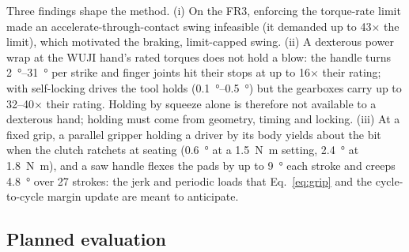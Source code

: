 Three findings shape the method. (i) On the FR3, enforcing the torque-rate limit made an accelerate-through-contact
swing infeasible (it demanded up to 43$\times$ the limit), which motivated the braking, limit-capped swing. (ii) A
dexterous power wrap at the WUJI hand's rated torques does not hold a blow: the handle turns
\SIrange{2}{31}{\degree} per strike and finger joints hit their stops at up to 16$\times$ their rating; with
self-locking drives the tool holds (\SIrange{0.1}{0.5}{\degree}) but the gearboxes carry up to 32--40$\times$ their
rating. Holding by squeeze alone is therefore not available to a dexterous hand; holding must come from geometry,
timing and locking. (iii) At a fixed grip, a parallel gripper holding a driver by its body yields about the bit when the clutch
ratchets at seating (\SI{0.6}{\degree} at a \SI{1.5}{\newton\metre} setting, \SI{2.4}{\degree} at \SI{1.8}{\newton\metre}), and a saw handle flexes the pads by up to \SI{9}{\degree} each stroke and creeps
\SI{4.8}{\degree} over 27 strokes: the jerk and periodic loads that Eq.~\eqref{eq:grip} and the cycle-to-cycle
margin update are meant to anticipate.

\subsection{Planned evaluation}
